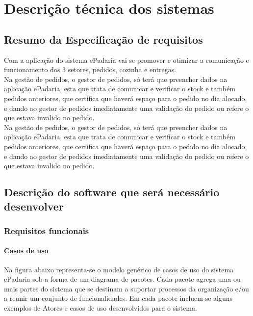 
\chapter{Descrição técnica dos sistemas}
\label{descricao_tecnica_dos_sistemas}

\section{Resumo da Especificação de requisitos}
Com a aplicação do sistema ePadaria vai se promover e otimizar a comunicação e funcionamento dos 3 setores, pedidos, cozinha e entregas.\\
Na gestão de pedidos, o gestor de pedidos, só terá que preencher dados na aplicação ePadaria, esta que trata de comunicar e verificar o stock e também pedidos anteriores, que certifica que haverá espaço para o pedido no dia alocado, e dando ao gestor de pedidos imediatamente uma validação do pedido ou refere o que estava invalido no pedido.\\
Na gestão de pedidos, o gestor de pedidos, só terá que preencher dados na aplicação ePadaria, esta que trata de comunicar e verificar o stock e também pedidos anteriores, que certifica que haverá espaço para o pedido no dia alocado, e dando ao gestor de pedidos imediatamente uma validação do pedido ou refere o que estava invalido no pedido.\\


\section{Descrição do software que será necessário desenvolver}
\subsection{Requisitos funcionais}
\subsubsection{Casos de uso}
Na figura abaixo representa-se o modelo genérico de casos de uso do sistema ePadaria sob a forma de um diagrama de pacotes. Cada pacote agrega uma ou mais partes do sistema que se destinam a suportar processos da organização e/ou a reunir um conjunto de funcionalidades. Em cada pacote incluem-se alguns exemplos de Atores e casos de uso desenvolvidos para o sistema.

